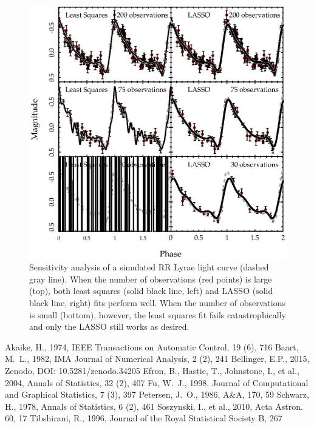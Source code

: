 \documentclass[11pt,twoside]{book}
\begin{document}
\begin{figure}[!ht]
    \centering
    \includegraphics[width=\textwidth,keepaspectratio]{bellinger-fig3.eps}
    \caption{Sensitivity analysis of a simulated RR Lyrae light curve (dashed gray line). When the number of observations (red points) is large (top), both least squares (solid black line, left) and LASSO (solid black line, right) fits perform well. When the number of observations is small (bottom), however, the least squares fit fails catastrophically and only the LASSO still works as desired.} 
    \label{fig:sensitivity} 
\end{figure}
\begin{thebibliography}{}      
Akaike, H., 1974, IEEE Transactions on Automatic Control, 19 (6), 716
Baart, M.~L., 1982, IMA Journal of Numerical Analysis, 2 (2), 241
Bellinger, E.P., 2015, Zenodo, DOI: 10.5281/zenodo.34205
Efron, B., Hastie, T., Johnstone, I., et al., 2004, Annals of Statistics, 32 (2), 407
Fu, W.~J., 1998, Journal of Computational and Graphical Statistics, 7 (3), 397
Petersen, J.~O., 1986, A\&A, 170, 59
Schwarz, H., 1978, Annals of Statistics, 6 (2), 461
Soszynski, I., et al., 2010, Acta Astron. 60, 17
Tibshirani, R., 1996, Journal of the Royal Statistical Society B, 267
\end{thebibliography}
\end{document}
